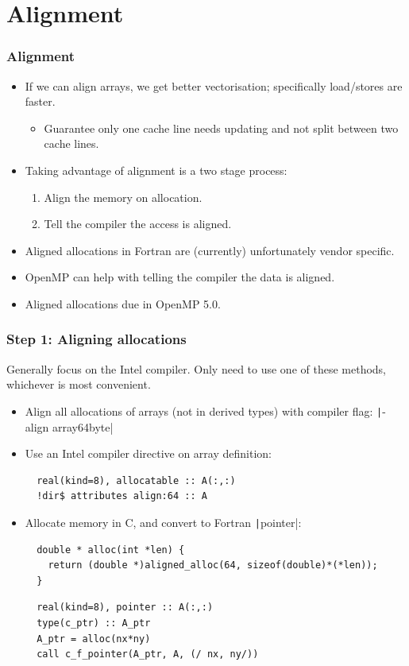 \documentclass{beamer}
\begin{document}
\section{Alignment}
\begin{frame}
\frametitle{Alignment}
\begin{itemize}
  \item If we can align arrays, we get better vectorisation; specifically load/stores are faster.
    \begin{itemize}
      \item Guarantee only one cache line needs updating and not split between two cache lines.
    \end{itemize}
  \item Taking advantage of alignment is a two stage process:
    \begin{enumerate}
      \item Align the memory on allocation.
      \item Tell the compiler the access is aligned.
    \end{enumerate}
  \item Aligned allocations in Fortran are (currently) unfortunately vendor specific.
  \item OpenMP can help with telling the compiler the data is aligned.
  \item Aligned allocations due in OpenMP 5.0.
\end{itemize}
\end{frame}

\begin{frame}[fragile]
\frametitle{Step 1: Aligning allocations}
Generally focus on the Intel compiler.
Only need to use one of these methods, whichever is most convenient.
\begin{itemize}
  \item Align all allocations of arrays (not in derived types) with compiler flag: \texttt|-align array64byte|
  \item Use an Intel compiler directive on array definition:
  \begin{verbatim}
  real(kind=8), allocatable :: A(:,:)
  !dir$ attributes align:64 :: A
  \end{verbatim}
  \item Allocate memory in C, and convert to Fortran \texttt|pointer|:
  \begin{verbatim}
  double * alloc(int *len) {
    return (double *)aligned_alloc(64, sizeof(double)*(*len));
  }
  \end{verbatim}
  \begin{verbatim}
  real(kind=8), pointer :: A(:,:)
  type(c_ptr) :: A_ptr
  A_ptr = alloc(nx*ny)
  call c_f_pointer(A_ptr, A, (/ nx, ny/))
  \end{verbatim}
\end{itemize}
\end{frame}
\end{document}

